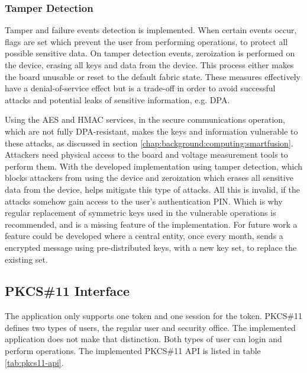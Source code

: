 \subsubsection*{Tamper Detection}

Tamper and failure events detection is implemented. When certain events occur, flags are set which prevent the user from performing operations, to protect all possible sensitive data.
On tamper detection events, zeroization is performed on the device, erasing all keys and data from the device. This process either makes the board unusable or reset to the default fabric state.
These measures effectively have a denial-of-service effect but is a trade-off in order to avoid successful attacks and potential leaks of sensitive information, e.g. \ac{DPA}.

Using the AES and HMAC services, in the secure communications operation, which are not fully DPA-resistant, makes the keys and information vulnerable to these attacks, as discussed in section \ref{chap:background:computing:smartfusion}.
Attackers need physical access to the board and voltage measurement tools to perform them.
With the developed implementation using tamper detection, which blocks attackers from using the device and zeroization which erases all sensitive data from the device, helps mitigate this type of attacks.
All this is invalid, if the attacks somehow gain access to the user's authentication PIN.
Which is why regular replacement of symmetric keys used in the vulnerable operations is recommended, and is a missing feature of the implementation.
For future work a feature could be developed where a central entity, once every month, sends a encrypted message using pre-distributed keys, with a new key set, to replace the existing set.


\subsection{PKCS\#11 Interface}\label{chap:implementation:app:interface}

The application only supports one token and one session for the token.
PKCS\#11 defines two types of users, the regular user and security office. The implemented application does not make that distinction. Both types of user can login and perform operations.
The implemented PKCS\#11 API is listed in table \ref{tab:pkcs11-api}.

